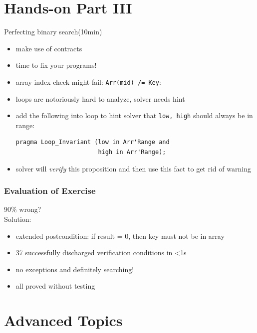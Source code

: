 \section{Hands-on Part III}
\begin{frame}[fragile]{Perfecting binary search\hfill (10min)} 
  \begin{itemize}
  \item make use of contracts
  \item time to fix your programs!

  \item \alert{array index check might fail: \texttt{Arr(mid) /= Key}}:
  \item loops are notoriously hard to analyze, solver needs hint
  \item add the following into loop to hint solver that \texttt{low, high} should always be in range:
\begin{lstlisting}
pragma Loop_Invariant (low in Arr'Range and 
                       high in Arr'Range);
\end{lstlisting}
  \item solver will \emph{verify} this proposition and then use this fact to get rid of warning
  \end{itemize}
\end{frame}
\addtocounter{clock}{10}

\begin{frame}
  \frametitle{Evaluation of Exercise}
  90\% wrong?\\\vspace{2em}
  Solution: %
  \begin{itemize}
  \item extended postcondition: if result = 0, then key must not be in array
  \item 37 successfully discharged verification conditions in <1s
  \item no exceptions and definitely searching!
  \item all proved without testing
  \end{itemize}
\end{frame}
\addtocounter{clock}{2}

\section{Advanced Topics}

